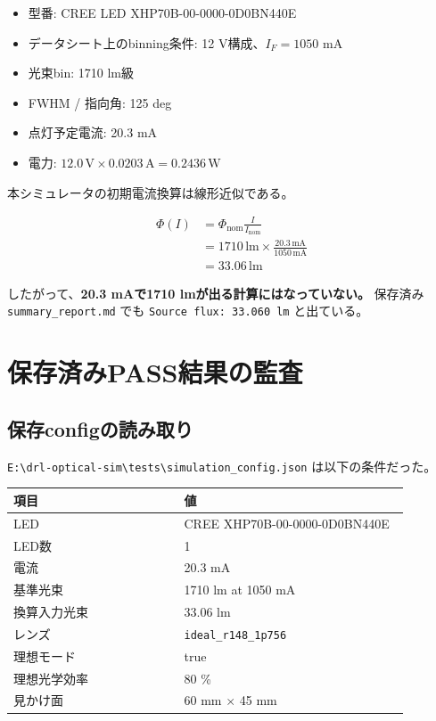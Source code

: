 \documentclass[11pt,a4paper]{article}
\begin{document}
\begin{itemize}
\item 型番: CREE LED XHP70B-00-0000-0D0BN440E
\item データシート上のbinning条件: 12 V構成、$I_F=1050$ mA
\item 光束bin: 1710 lm級
\item FWHM / 指向角: 125 deg
\item 点灯予定電流: 20.3 mA
\item 電力: $12.0\,\mathrm{V}\times0.0203\,\mathrm{A}=0.2436\,\mathrm{W}$
\end{itemize}

本シミュレータの初期電流換算は線形近似である。

\begin{align}
\Phi(I) &= \Phi_\mathrm{nom}\frac{I}{I_\mathrm{nom}}\\
        &= 1710\,\mathrm{lm}\times\frac{20.3\,\mathrm{mA}}{1050\,\mathrm{mA}}\\
        &= 33.06\,\mathrm{lm}
\end{align}

したがって、\textbf{20.3 mAで1710 lmが出る計算にはなっていない。}
保存済み \texttt{summary\_report.md} でも \texttt{Source flux: 33.060 lm} と出ている。

\section{保存済みPASS結果の監査}
\subsection{保存configの読み取り}
\texttt{E:\textbackslash drl-optical-sim\textbackslash tests\textbackslash simulation\_config.json} は以下の条件だった。

\begin{longtable}{p{0.38\linewidth}p{0.50\linewidth}}
\toprule
項目 & 値 \\
\midrule
LED & CREE XHP70B-00-0000-0D0BN440E\\
LED数 & 1\\
電流 & 20.3 mA\\
基準光束 & 1710 lm at 1050 mA\\
換算入力光束 & 33.06 lm\\
レンズ & \texttt{ideal\_r148\_1p756}\\
理想モード & true\\
理想光学効率 & 80 \%\\
見かけ面 & 60 mm $\times$ 45 mm\\
\bottomrule
\end{longtable}
\end{document}
